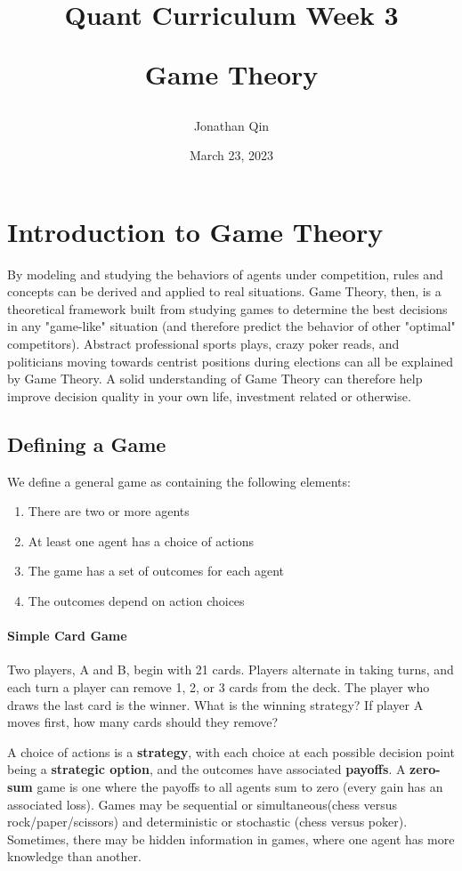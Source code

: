 \documentclass{article}
\title{

\begin{center} \textbf{Quant Curriculum Week 3}

Game Theory \end{center}
}
\author{Jonathan Qin}
\date{March 23, 2023}
\begin{document}
\maketitle

\section{Introduction to Game Theory }

By modeling and studying the behaviors of agents under competition, rules and concepts can be derived and applied to real situations. Game Theory, then, is a theoretical framework built from studying games to determine the best decisions in any "game-like" situation (and therefore predict the behavior of other "optimal" competitors). Abstract professional sports plays, crazy poker reads, and politicians moving towards centrist positions during elections can all be explained by Game Theory. A solid understanding of Game Theory can therefore help improve decision quality in your own life, investment related or otherwise. 

\subsection{Defining a Game}

We define a general game as containing the following elements:
\begin{enumerate}
    \item There are two or more agents
    \item At least one agent has a choice of actions
    \item The game has a set of outcomes for each agent
    \item The outcomes depend on action choices
\end{enumerate}

\paragraph{Simple Card Game}
Two players, A and B, begin with 21 cards. Players alternate in taking turns, and each turn a player can remove 1, 2, or 3 cards from the deck. The player who draws the last card is the winner. What is the winning strategy? If player A moves first, how many cards should they remove?
\newline
\newline


A choice of actions is a \textbf{strategy}, with each choice at each possible decision point being a \textbf{strategic option}, and the outcomes have associated \textbf{payoffs}. A \textbf{zero-sum} game is one where the payoffs to all agents sum to zero (every gain has an associated loss). Games may be sequential or simultaneous(chess versus rock/paper/scissors) and deterministic or stochastic (chess versus poker). Sometimes, there may be hidden information in games, where one agent has more knowledge than another. 
\end{document}
